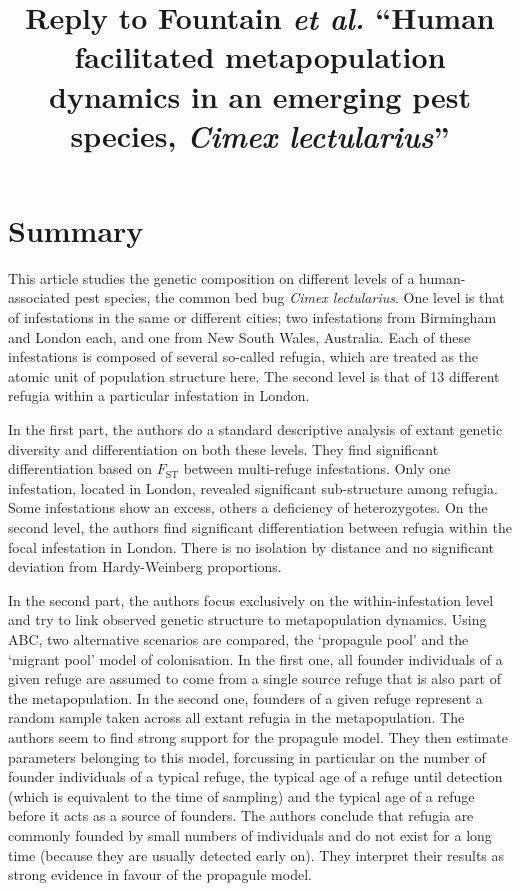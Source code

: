 \documentclass[11pt]{article}
\title{Reply to Fountain \emph{et al.} ``Human facilitated metapopulation dynamics in an emerging pest species, \emph{Cimex lectularius}''}
\begin{document}
\maketitle

\section{Summary}
This article studies the genetic composition on different levels of a human-associated pest species, the common bed bug \emph{Cimex lectularius}. One level is that of infestations in the same or different cities; two infestations from Birmingham and London each, and one from New South Wales, Australia. Each of these infestations is composed of several so-called refugia, which are treated as the atomic unit of population structure here. The second level is that of 13 different refugia within a particular infestation in London.

In the first part, the authors do a standard descriptive analysis of extant genetic diversity and differentiation on both these levels. They find significant differentiation based on $F_{\mathrm{ST}}$ between multi-refuge infestations. Only one infestation, located in London, revealed significant sub-structure among refugia. Some infestations show an excess, others a deficiency of heterozygotes. On the second level, the authors find significant differentiation between refugia within the focal infestation in London. There is no isolation by distance and no significant deviation from Hardy-Weinberg proportions.

In the second part, the authors focus exclusively on the within-infestation level and try to link observed genetic structure to metapopulation dynamics. Using ABC, two alternative scenarios are compared, the `propagule pool' and the `migrant pool' model of colonisation. In the first one, all founder individuals of a given refuge are assumed to come from a single source refuge that is also part of the metapopulation. In the second one, founders of a given refuge represent a random sample taken across all extant refugia in the metapopulation. The authors seem to find strong support for the propagule model. They then estimate parameters belonging to this model, forcussing in particular on the number of founder individuals of a typical refuge, the typical age of a refuge until detection (which is equivalent to the time of sampling) and the typical age of a refuge before it acts as a source of founders. The authors conclude that refugia are commonly founded by small numbers of individuals and do not exist for a long time (because they are usually detected early on). They interpret their results as strong evidence in favour of the propagule model.
\end{document}
